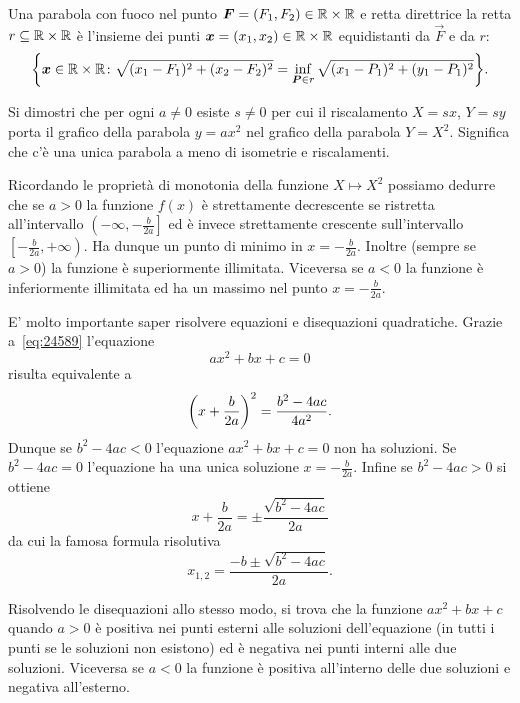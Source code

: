 \begin{definition}[parabola]
  Una parabola con fuoco nel punto $\boldsymbol F=(F_1,F_2)\in {\mathbb R}\times {\mathbb R}$ 
  e retta direttrice 
  la retta $r \subseteq {\mathbb R}\times{\mathbb R}$ 
  è l'insieme dei punti  $\boldsymbol x = (x_1,x_2)\in {\mathbb R}\times{\mathbb R}$ 
  equidistanti da $\vec F$ e da $r$:
  \[
  {\left\{ \boldsymbol x\in {\mathbb R}\times{\mathbb R}\colon 
  \sqrt{(x_1-F_1)^2 + (x_2-F_2)^2} 
  = \inf_{\boldsymbol P\in r}\sqrt{(x_1-P_1)^2+(y_1-P_1)^2}
   \right\}}.
  \]
\end{definition}

\begin{exercise}
  Si dimostri che per ogni $a\neq 0$ esiste $s\neq 0$ 
  per cui il riscalamento $X=sx$, $Y=sy$ porta il grafico della 
  parabola $y=ax^2$ nel grafico della parabola $Y=X^2$.
  Significa che 
  c'è una unica parabola 
  a meno di isometrie e riscalamenti.
\end{exercise}

Ricordando le proprietà di monotonia della funzione $X\mapsto X^2$
possiamo dedurre che se $a>0$ la funzione $f(x)$ è strettamente
decrescente se ristretta all'intervallo 
$\left(-\infty,-\frac b {2a}\right]$ ed è invece strettamente crescente 
sull'intervallo $\left[-\frac b{2a},+\infty\right)$. 
Ha dunque un punto di minimo in $x=-\frac{b}{2a}$.
Inoltre (sempre se $a>0$) la funzione è superiormente illimitata.
Viceversa se $a<0$ la funzione è inferiormente illimitata ed ha 
un massimo nel punto $x=-\frac{b}{2a}$.

E' molto importante saper risolvere equazioni e disequazioni
quadratiche. Grazie a~\eqref{eq:24589} l'equazione
\[
 a x^2 + bx + c = 0
\]
risulta equivalente a
\[
  {\left( x+\frac{b}{2a} \right)}^2 = \frac{b^2-4ac}{4a^2}.
\]
Dunque se $b^2-4ac<0$ l'equazione $ax^2+bx+c=0$ non ha soluzioni.
Se $b^2-4ac=0$ l'equazione ha una unica soluzione $x=-\frac{b}{2a}$.
Infine se $b^2-4ac>0$ si ottiene
\[
  x+\frac b{2a} = \pm \frac{\sqrt{b^2-4ac}}{2a}
\]
da cui la famosa formula risolutiva
\mymark{***}
\begin{equation}\label{eq:secondo_grado}
  x_{1,2} = \frac{-b \pm \sqrt{b^2-4ac}}{2a}.
\end{equation}

Risolvendo le disequazioni allo stesso modo, si trova
che la funzione $ax^2+bx+c$ quando $a>0$ è positiva
nei punti esterni alle soluzioni dell'equazione
(in tutti i punti se le soluzioni non esistono) ed
è negativa nei punti interni alle due soluzioni.
Viceversa se $a<0$ la funzione è positiva all'interno
delle due soluzioni e negativa all'esterno.


